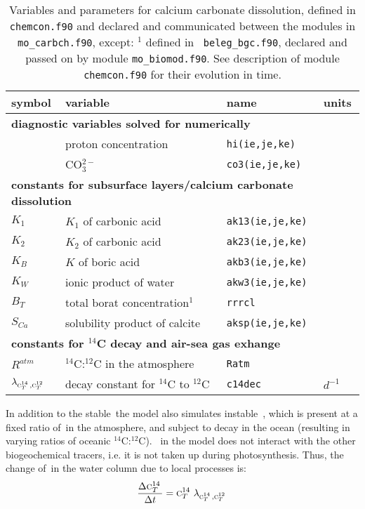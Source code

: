 \documentclass[11pt,a4paper,fleqn,twoside]{article}
\def\car{\text{\textsc{c$_T^{12}$}}\,}
\def\cariso{\text{\textsc{c$_T^{14}$}}\,}
\def\hi{\text{\textsc{H$^+$}}\,}
\def\cartwo{\text{\textsc{CO$_3^{2-}$}}\,}
\begin{document}
\begin{table}[hbt]
\caption{\label{tab_carb_params} Variables and parameters for calcium carbonate
dissolution, defined in {\tt chemcon.f90} and  declared and communicated
between the modules in {\tt mo\_carbch.f90},  except: $^1$ defined in {\tt
beleg\_bgc.f90}, declared and passed on by module {\tt mo\_biomod.f90}. 
See description of module {\tt chemcon.f90} for their evolution in time.} 
\vspace{.2cm}
\begin{center}
\begin{tabular}{llll} \hline
symbol & variable        & name     & units\\ \hline
\multicolumn{4}{l}{\rule{0mm}{4mm}\bf diagnostic variables solved for
numerically}\\ \hline
\hi      & proton concentration   & {\tt hi(ie,je,ke)}  &\\
\cartwo  & CO$_3^{2-}$            & {\tt co3(ie,je,ke)} & \\
\multicolumn{4}{l}{\rule{0mm}{4mm}\bf constants for subsurface layers/calcium
carbonate dissolution}\\ \hline
$K_1$    &$K_1$ of carbonic acid  & {\tt ak13(ie,je,ke)} & \\
$K_2$    &$K_2$ of carbonic acid  & {\tt ak23(ie,je,ke)} & \\
$K_B$    &$K$ of boric acid       & {\tt akb3(ie,je,ke)} & \\
$K_W$    &ionic product of water  & {\tt akw3(ie,je,ke)} & \\
$B_T$    &total borat concentration$^1$  & {\tt rrrcl} & \\
$S_{Ca}$ &solubility product of calcite  & {\tt aksp(ie,je,ke)} & \\ 
\multicolumn{4}{l}{\rule{0mm}{4mm}\bf constants for $^{14}$C decay and air-sea gas
exhange}\\ \hline
$R^{atm}$ & $^{14}$C:$^{12}$C in the atmosphere & {\tt Ratm} & \\ 
$\lambda_{\cariso,\car}$ & decay constant for $^{14}$C to $^{12}$C & {\tt c14dec} & $d^{-1}$\\ \hline
\end{tabular}
\end{center}
\end{table}

In addition to the stable \car the model also simulates instable \cariso, which is
present at a  fixed ratio of \car in the atmosphere, and subject to decay in
the ocean (resulting in varying ratios of oceanic  $^{14}$C:$^{12}$C). \cariso
in the model does not interact with the other biogeochemical tracers, i.e. it
is not taken up during photosynthesis. Thus, the change of
\cariso in the water column due to local processes is:
\begin{equation}
\frac{\Delta  \cariso}{\Delta  t} =   \cariso \, \lambda_{\cariso,\car}
\end{equation}
\end{document}
